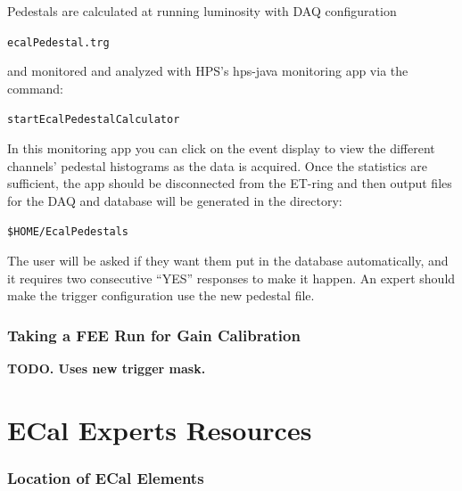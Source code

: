 \documentclass[12pt]{article}
\begin{document}
   Pedestals are calculated at running luminosity with DAQ configuration \begin{center}\texttt{ecalPedestal.trg}\end{center} and monitored and analyzed with HPS's hps-java monitoring app via the command:
       \begin{center}\texttt{startEcalPedestalCalculator}\end{center}
       In this monitoring app you can click on the event display to view the different channels' pedestal histograms as the data is acquired.  Once the statistics are sufficient, the app should be disconnected from the ET-ring and then output files for the DAQ and database will be generated in the directory:\begin{center}\texttt{\$HOME/EcalPedestals}\end{center}  The user will be asked if they want them put in the database automatically, and it requires two consecutive ``YES'' responses to make it happen.  An expert should make the trigger configuration use the new pedestal file.

    \section{Taking a FEE Run for Gain Calibration}
    {\bf TODO.  Uses new trigger mask.}

\newpage

\part{ECal Experts Resources}

   \section{Location of ECal Elements}
\end{document}

